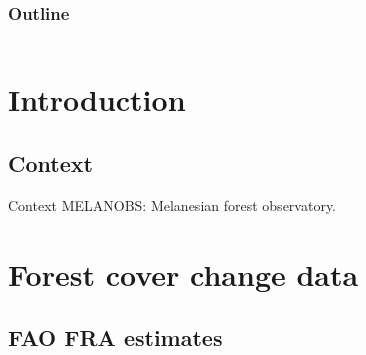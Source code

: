 \documentclass[10pt,table,dvipsnames,compress]{beamer}
\newif\ifplacelogo %
\begin{document}

\placelogotrue
\begin{frame}
  \frametitle{Outline}
  \begin{columns}[c]
    \begin{column}{0.5\textwidth}
      \tableofcontents[sections=1]
      \vspace{0.5cm}
      \tableofcontents[sections=2]
    \end{column}
    \begin{column}{0.5\textwidth}
        \tableofcontents[sections=3]
        \vspace{0.5cm}
        \tableofcontents[sections=4]
    \end{column}
  \end{columns}
\end{frame}
\placelogofalse

\section{Introduction}
\label{sec:orgb719490}
\subsection{Context}
\label{sec:orgeb93aca}
\begin{frame}[label={sec:org993b376}]{Context}
MELANOBS: Melanesian forest observatory.
\end{frame}

\section{Forest cover change data}
\label{sec:org2615883}

\subsection{FAO FRA estimates}
\label{sec:org2bab3bb}
\end{document}
